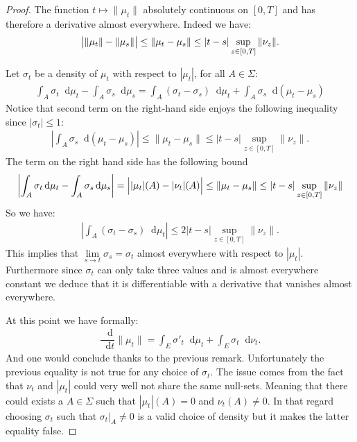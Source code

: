 \documentclass[11pt,a4paper]{article}
\newcommand{\dd}{\mathop{}\!\mathrm{d}}
\begin{document}
\begin{proof}
    The function $t \mapsto \|\mu_t\|$ absolutely continuous on $[0,T]$ and has therefore a derivative almost everywhere. Indeed we have:
    \begin{align}\label{proof:kolokol_lemma-absolute-continuous}
       \left\lvert \vphantom{A^2}\| \mu_t \| - \|\mu_s\|\right\rvert \leq \|\mu_t - \mu_s \| \leq |t-s|\sup\limits_{z \in [0,T]} \|\nu_z\|.
    \end{align}
    
    Let $\sigma_t$ be a density of $\mu_t$ with respect to $|\mu_t|$, for all $A \in \Sigma$:
    \begin{align*}
        \int_A\sigma_{t } \dd \mu_{t} - \int_A \sigma_{s} \dd\mu_{s} = \int_A (\sigma_{t}-\sigma_s)\dd\mu_{t }  + \int_A \sigma_s \dd(\mu_{t } - \mu_s)
    \end{align*}
    Notice that second term on the right-hand side enjoys the following inequality since $|\sigma_t| \leq 1$:
    \begin{align*}
        \left\lvert \int_A \sigma_s \dd(\mu_{t } - \mu_s) \right\rvert\leq \|\mu_t - \mu_s \| \leq |t-s|\sup\limits_{z \in [0,T]} \|\nu_z\|.
    \end{align*}
    The term on the right hand side has the following bound
    \begin{align*}
        \left\lvert \int_A\sigma_{t } \dd \mu_{t} - \int_A \sigma_{s} \dd\mu_{s} \right\rvert = \left\lvert \vphantom{A^{2^2}}|\mu_t|(A) -|\nu_t|(A) \right\rvert \leq \| \mu_{t } - \mu_s \| \leq |t-s|\sup\limits_{z \in [0,T]} \|\nu_z\|
    \end{align*}
    So we have:
    \begin{align*}
        \left\lvert \int_A (\sigma_{t}-\sigma_s)\dd\mu_{t } \right\rvert\leq 2|t-s|\sup\limits_{z \in [0,T]} \|\nu_z\|.
    \end{align*}
    This implies that $\lim\limits_{s \to t} \sigma_s = \sigma_t$ almost everywhere with respect to $|\mu_t|$. Furthermore since $\sigma_t$ can only take three values and is almost everywhere constant we deduce that it is differentiable with a derivative that vanishes almost everywhere.
    
    At this point we have formally:
    \begin{align*}
        \dfrac{\dd}{\dd t} \| \mu_t \| = \int_E\sigma'_t \dd \mu_t + \int_E \sigma_t \dd \nu_t. 
    \end{align*}
    And one would conclude thanks to the previous remark. Unfortunately the previous equality is not true for any choice of $\sigma_t$. The issue comes from the fact that $\nu_t$ and $|\mu_t|$ could very well not share the same null-sets. Meaning that there could exists a $A  \in \Sigma$ such that $|\mu_t|(A) = 0$ and $\nu_t(A) \neq 0$. In that regard choosing $\sigma_t$ such that $\sigma_t|_A \neq 0$ is a valid choice of density but it makes the latter equality false.


\end{proof}
\end{document}
